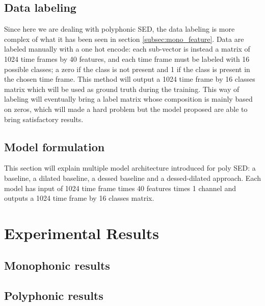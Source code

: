 \documentclass{article}
\begin{document}
\subsection{Data labeling}
\label{subsec:poly_label}

Since here we are dealing with polyphonic SED, the data labeling is more complex of what it has been seen in section \ref{subsec:mono_feature}. Data are labeled manually with a one hot encode: each sub-vector is instead a matrix of 1024 time frames by 40 features, and each time frame must be labeled with 16 possible classes; a zero if the class is not present and 1 if the class is present in the chosen time frame. This method will output a 1024 time frame by 16 classes matrix which will be used as ground truth during the training. This way of labeling will eventually bring a label matrix whose composition is mainly based on zeros, which will made a hard problem but the model proposed are able to bring satisfactory results.

\subsection{Model formulation}
\label{subsec:poly_model}

This section will explain multiple model architecture introduced for poly SED: a baseline, a dilated baseline, a dessed baseline and a dessed-dilated approach. Each model has input of 1024 time frame times 40 features times 1 channel and outputs a 1024 time frame by 16 classes matrix.




\section{Experimental Results}
\label{sec:results}

\subsection{Monophonic results}
\label{subsec:mono_results}

\subsection{Polyphonic results}
\label{subsec:poly_results}
\end{document}
